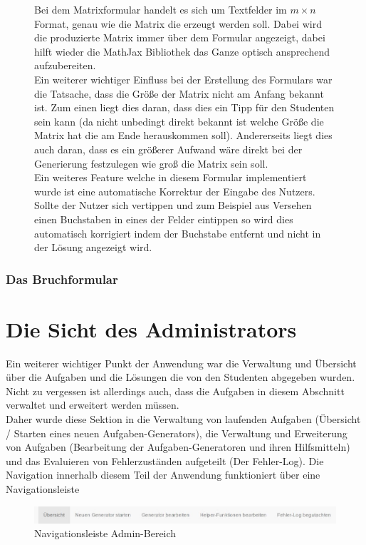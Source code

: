 \begin{enumerate}
\begin{figure}[htp]
Bei dem Matrixformular handelt es sich um Textfelder im $ m\times n$ Format, genau wie die Matrix die erzeugt werden soll. Dabei wird die produzierte Matrix immer über dem Formular angezeigt, dabei hilft wieder die MathJax Bibliothek das Ganze optisch ansprechend aufzubereiten. \\

Ein weiterer wichtiger Einfluss bei der Erstellung des Formulars war die Tatsache, dass die Größe der Matrix nicht am Anfang bekannt ist. Zum einen liegt dies daran, dass dies ein Tipp für den Studenten sein kann (da nicht unbedingt direkt bekannt ist welche Größe die Matrix hat die am Ende herauskommen soll). Andererseits liegt dies auch daran, dass es ein größerer Aufwand wäre direkt bei der Generierung festzulegen wie groß die Matrix sein soll. \\

Ein weiteres Feature welche in diesem Formular implementiert wurde ist eine automatische Korrektur der Eingabe des Nutzers. Sollte der Nutzer sich vertippen und zum Beispiel aus Versehen einen Buchstaben in eines der Felder eintippen so wird dies automatisch korrigiert indem der Buchstabe entfernt und nicht in der Lösung angezeigt wird.


\end{figure} 



\subsubsection{Das Bruchformular}



\section{Die Sicht des Administrators}

Ein weiterer wichtiger Punkt der Anwendung war die Verwaltung und Übersicht über die Aufgaben und die Lösungen die von den Studenten abgegeben wurden. Nicht zu vergessen ist allerdings auch, dass die Aufgaben in diesem Abschnitt verwaltet und erweitert werden müssen. \\
Daher wurde diese Sektion in die Verwaltung von laufenden Aufgaben (Übersicht / Starten eines neuen Aufgaben-Generators), die Verwaltung und Erweiterung von Aufgaben (Bearbeitung der Aufgaben-Generatoren und ihren Hilfsmitteln) und das Evaluieren von Fehlerzuständen aufgeteilt (Der Fehler-Log). Die Navigation innerhalb diesem Teil der Anwendung funktioniert über eine Navigationsleiste \\
\begin{figure}[htp]     %
\centering
\includegraphics[width=1\textwidth]{bilder/NavBar} 
\caption[Navigationsleiste Admin-Bereich]{Navigationsleiste Admin-Bereich}
\end{figure} 


\end{enumerate}
